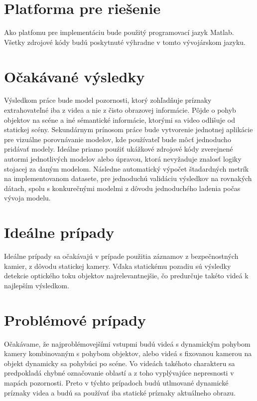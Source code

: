 \section{Platforma pre riešenie}
Ako platfomu pre implementáciu bude použitý programovací jazyk Matlab\textregistered.
Všetky zdrojové kódy budú poskytnuté výhradne v tomto vývojárskom jazyku.
\section{Očakávané výsledky}
Výsledkom práce bude model pozornosti, ktorý zohľadňuje príznaky extrahovateľné iba z videa a nie z čisto obrazovej informácie.
Pôjde o pohyb objektov na scéne a iné sémantické informácie, ktorými sa video odlišuje od statickej scény.
Sekundárnym prínosom práce bude vytvorenie jednotnej aplikácie pre vizuálne porovnávanie modelov, kde používateľ bude môcť jednoducho pridávať modely. Ideálne priamo pouźiť ukážkové zdrojové kódy zverejnené autormi jednotlivých modelov alebo úpravou, ktorá nevyžaduje znalosť logiky stojacej za daným modelom.
Následne automatický výpočet štadardných metrík na implementovanom datasete, pre jednoduchú validáciu výsledkov na rovnakých dátach, spolu s konkurečnými modelmi z dôvodu jednoduchého ladenia počas vývoja modelu.
\section{Ideálne prípady}
Ideálne prípady sa očakávajú v prípade použitia záznamov z bezpečnostných kamier, z dôvodu statickej kamery.
Vďaka statickému pozadiu sú výsledky detekcie optického toku objektov najrelevantnejšie, čo predurčuje takéto videá k najlepším výsledkom.
\section{Problémové prípady}
Očakávame, že najproblémovejšími vstupmi budú videá s dynamickým pohybom kamery kombinovaným s pohybom objektov, alebo videá s fixovanou kamerou na objekt dynamicky sa pohybúci po scéne.
Vo videách takéhoto charakteru sa predpokladá chybné označovanie oblastí a z toho vyplývajúce nepresnosti v mapách pozornosti.
Preto v týchto prípadoch budú utlmované dynamické príznaky videa a budú sa používať iba statické príznaky aktuálneho obrazu.
